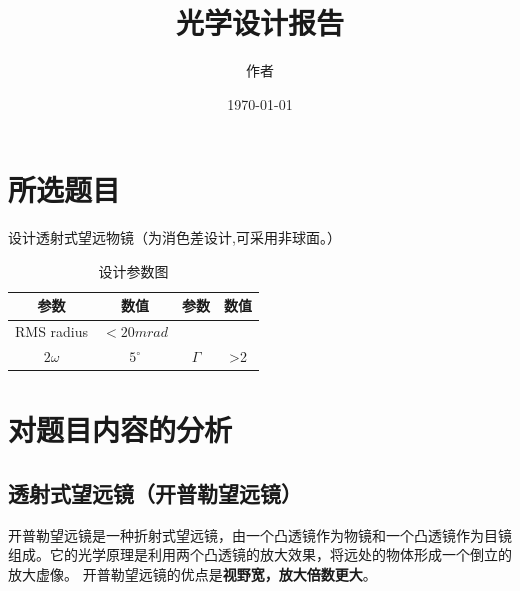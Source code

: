 \documentclass{article}
\title{光学设计报告}
\author{作者}
\date{\today}
\begin{document}
\maketitle
\newpage

\renewcommand{\baselinestretch}{1.35}
\tableofcontents
\newpage

\setlength{\parskip}{0em}
\renewcommand{\baselinestretch}{1.53}


\section{所选题目}
设计透射式望远物镜（为消色差设计,可采用非球面。）
% 
\begin{table}[H]
  \centering
  \begin{tabular}{cc|cc}
  \hline
  参数&数值&参数&数值 \\ \hline
  RMS radius&$<20mrad$&&\\ 
  $2 \omega$&$5^{\circ}$ &$\Gamma$&>2\\ \hline
  \end{tabular}
  \caption{设计参数图}
  \end{table}
\section{对题目内容的分析}

\subsection{透射式望远镜（开普勒望远镜）}
开普勒望远镜是一种折射式望远镜，由一个凸透镜作为物镜和一个凸透镜作为目镜组成。它的光学原理是利用两个凸透镜的放大效果，将远处的物体形成一个倒立的放大虚像。
开普勒望远镜的优点是\textbf{视野宽，放大倍数更大}。
\end{document}
